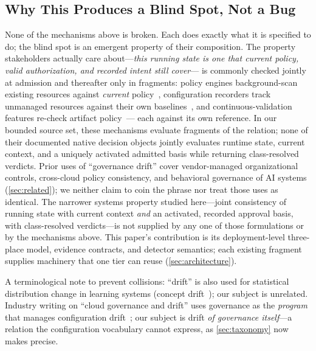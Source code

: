 \subsection{Why This Produces a Blind Spot, Not a Bug}
None of the mechanisms above is broken. Each does exactly what it is specified
to do; the blind spot is an emergent property of their composition. The
property stakeholders actually care about---\emph{this running state is one
that current policy, valid authorization, and recorded intent still cover}---%
is commonly checked jointly at admission and thereafter only in fragments:
policy engines background-scan existing resources against
\emph{current} policy~\cite{kyverno,opa}, configuration recorders track
unmanaged resources against their own baselines~\cite{awsconfig}, and
continuous-validation features re-check artifact policy~\cite{binauthz}---%
each against its own reference. In our bounded source set, these mechanisms
evaluate fragments of the relation; none of their documented native decision
objects jointly evaluates runtime state, current context, and a uniquely
activated admitted basis while returning class-resolved verdicts. Prior uses of
``governance drift'' cover vendor-managed organizational controls,
cross-cloud policy consistency, and behavioral governance of AI systems
(\cref{sec:related}); we neither claim to coin the phrase nor treat those
uses as identical. The narrower systems property studied here---joint
consistency of running state with current context \emph{and} an activated,
recorded approval basis, with class-resolved verdicts---is not supplied by
any one of those formulations or by the mechanisms above. This paper's
contribution is its deployment-level three-place model, evidence contracts,
and detector semantics; each existing fragment supplies machinery that one
tier can reuse (\cref{sec:architecture}).

A terminological note to prevent collisions: ``drift'' is also used for
statistical distribution change in learning systems (concept
drift~\cite{gama2014}); our subject is unrelated. Industry writing on ``cloud
governance and drift'' uses governance as the \emph{program} that manages
configuration drift~\cite{industrydrift}; our subject is drift \emph{of
governance itself}---a relation the configuration vocabulary cannot express,
as \cref{sec:taxonomy} now makes precise.
